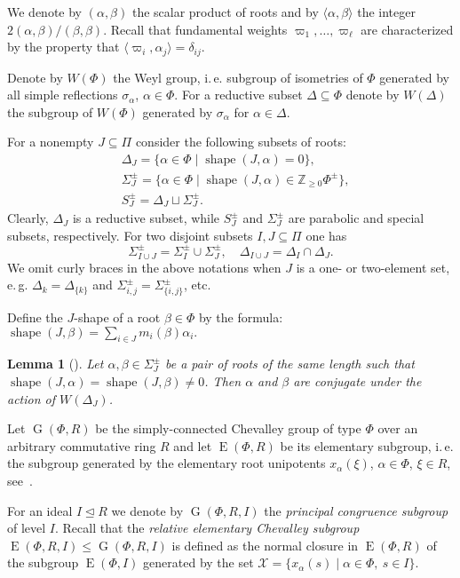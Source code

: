 \documentclass[11pt]{amsart}
\theoremstyle{plain}
\numberwithin{equation}{section}
\newtheorem{lemma}{Lemma}
\numberwithin{lemma}{section}
\theoremstyle{definition}
\theoremstyle{remark}
\DeclareMathOperator{\G}{G}
\DeclareMathOperator{\E}{E}
\DeclareMathOperator{\shape}{shape}
\begin{document}
We denote by $(\alpha, \beta)$ the scalar product of roots and by $\langle \alpha, \beta\rangle$ the integer $2(\alpha, \beta)/(\beta, \beta)$.
Recall that fundamental weights $\varpi_1,\ldots,\varpi_\ell$ are characterized by the property that $\langle \varpi_i, \alpha_j \rangle = \delta_{ij}$.
 
Denote by $W(\Phi)$ the Weyl group, i.\,e. subgroup of isometries of $\Phi$ generated by all simple reflections $\sigma_\alpha$, $\alpha\in\Phi$.
For a reductive subset $\Delta\subseteq \Phi$ denote by $W(\Delta)$ the subgroup of $W(\Phi)$ generated by $\sigma_\alpha$ for $\alpha\in\Delta$.

For a nonempty $J\subseteq \Pi$ consider the following subsets of roots:
\begin{align*}
& \Delta_J = \{\alpha \in \Phi \mid \shape(J, \alpha)=0\}, \\
& \Sigma^\pm_J = \{\alpha \in \Phi \mid \shape(J, \alpha) \in \mathbb{Z}_{\geqslant0} \Phi^\pm \}, \\
& S_J^\pm = \Delta_J \sqcup \Sigma_J^\pm.
\end{align*}
Clearly, $\Delta_J$ is a reductive subset, while $S^\pm_J$ and $\Sigma^\pm_J$ are parabolic and special subsets, respectively.
For two disjoint subsets $I, J\subseteq \Pi$ one has 
\[ \Sigma^\pm_{I \cup J} = \Sigma^\pm_I\cup\Sigma^\pm_J, \quad \Delta_{I\cup J} = \Delta_I \cap \Delta_J. \]
We omit curly braces in the above notations when $J$ is a one- or two-element set, e.\,g. $\Delta_k=\Delta_{\{k\}}$ and $\Sigma_{i, j}^\pm=\Sigma_{\{i, j\}}^\pm$, etc.

Define the $J$-shape of a root $\beta\in\Phi$ by the formula: $\shape(J, \beta)=\sum\nolimits_{i\in J} m_i(\beta) \alpha_i.$
\begin{lemma}[{\cite[Lemma~1]{ABS}}]\label{lemma:abs}
Let $\alpha, \beta \in \Sigma^\pm_J$ be a pair of roots of the same length such that $\shape(J, \alpha)=\shape(J, \beta)\neq 0$.
Then $\alpha$ and $\beta$ are conjugate under the action of $W(\Delta_J)$.
\end{lemma}

Let $\G(\Phi, R)$ be the simply-connected Chevalley group of type $\Phi$ over an arbitrary commutative ring $R$ and let $\E(\Phi, R)$ be its elementary subgroup,
i.\,e. the subgroup generated by the elementary root unipotents $x_\alpha(\xi)$, $\alpha\in\Phi$, $\xi\in R$, see~\cite{VP, St78, S}.

For an ideal $I \trianglelefteq R$ we denote by $\G(\Phi, R, I)$ the \emph{principal congruence subgroup} of level $I$.
Recall that the \emph{relative elementary Chevalley subgroup} $\E(\Phi, R, I) \leqslant \G(\Phi, R, I)$ is defined as the normal closure in $\E(\Phi, R)$ of the subgroup 
$\E(\Phi, I)$ generated by the set $\mathcal{X} = \{x_\alpha(s) \mid \alpha\in \Phi, \ s \in I \}$.
\end{document}
